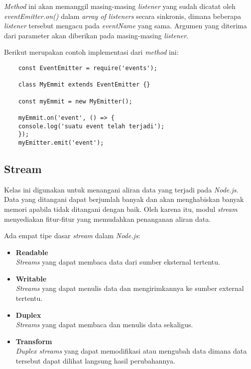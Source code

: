 \begin{itemize}
	\textit{Method} ini akan memanggil masing-masing \textit{listener} yang sudah dicatat oleh \textit{eventEmitter.on()} dalam \textit{array of listeners} secara sinkronis, dimana beberapa \textit{listener} tersebut mengacu pada \textit{eventName} yang sama. Argumen yang diterima dari parameter akan diberikan pada masing-masing \textit{listener}.
	
	Berikut merupakan contoh implementasi dari \textit{method} ini:
	\begin{lstlisting}
	const EventEmitter = require('events');
	
	class MyEmmit extends EventEmitter {}
	
	const myEmmit = new MyEmitter();
	
	myEmmit.on('event', () => {
	console.log('suatu event telah terjadi');	
	});
	myEmitter.emit('event');
	\end{lstlisting} 
\end{itemize}

\subsection{Stream}
Kelas ini digunakan untuk menangani aliran data yang terjadi pada \textit{Node.js}. Data yang ditangani dapat berjumlah banyak dan akan menghabiskan banyak memori apabila tidak ditangani dengan baik. Oleh karena itu, modul \textit{stream} menyediakan fitur-fitur yang memudahkan penanganan aliran data.

Ada empat tipe dasar \textit{stream} dalam \textit{Node.js}:
\begin{itemize}
	\item \textbf{Readable} \\ \textit{Streams} yang dapat membaca data dari sumber eksternal tertentu.
	\item \textbf{Writable} \\ \textit{Streams} yang dapat menulis data dan mengirimkannya ke sumber external tertentu.
	\item \textbf{Duplex} \\ \textit{Streams} yang dapat membaca dan menulis data sekaligus.
	\item \textbf{Transform} \\ \textit{Duplex streams} yang dapat memodifikasi atau mengubah data dimana data tersebut dapat dilihat langsung hasil perubahannya.
\end{itemize}

